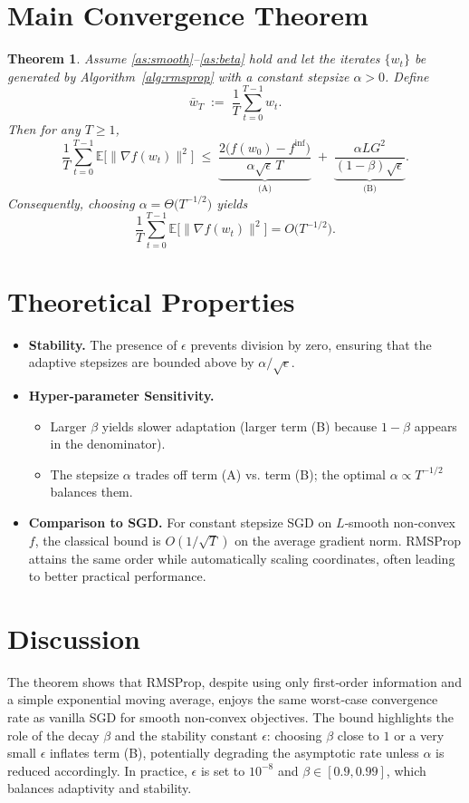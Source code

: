 \documentclass[11pt]{article}
\newtheorem{theorem}{Theorem}[section]
\begin{document}
\section*{Main Convergence Theorem}
\begin{theorem}\label{thm:main}
Assume \ref{as:smooth}–\ref{as:beta} hold and let the iterates $\{w_t\}$ be
generated by Algorithm~\ref{alg:rmsprop} with a constant stepsize $\alpha>0$.
Define
\[
\bar{w}_T \;:=\; \frac{1}{T}\sum_{t=0}^{T-1} w_t .
\]
Then for any $T\ge 1$,
\[
\frac{1}{T}\sum_{t=0}^{T-1}
\mathbb{E}\!\bigl[\|\nabla f(w_t)\|^2\bigr]
\;\le\;
\underbrace{\frac{2\bigl(f(w_0)-f^{\inf}\bigr)}{\alpha\sqrt{\epsilon}\,T}}_{\displaystyle
\text{(A)}}
\;+\;
\underbrace{\frac{\alpha L G^2}{(1-\beta)\sqrt{\epsilon}}}_{\displaystyle
\text{(B)}} .
\]
Consequently, choosing $\alpha = \Theta\!\bigl(T^{-1/2}\bigr)$ yields
\[
\frac{1}{T}\sum_{t=0}^{T-1}
\mathbb{E}\!\bigl[\|\nabla f(w_t)\|^2\bigr]
= O\!\bigl(T^{-1/2}\bigr).
\]
\end{theorem}

\section*{Theoretical Properties}
\begin{itemize}[leftmargin=*]
\item \textbf{Stability.} The presence of $\epsilon$ prevents division by zero,
ensuring that the adaptive stepsizes are bounded above by $\alpha/\sqrt{\epsilon}$.
\item \textbf{Hyper‑parameter Sensitivity.}
  \begin{itemize}
  \item Larger $\beta$ yields slower adaptation (larger term (B) because
    $1-\beta$ appears in the denominator).
  \item The stepsize $\alpha$ trades off term (A) vs. term (B); the optimal
    $\alpha\propto T^{-1/2}$ balances them.
  \end{itemize}
\item \textbf{Comparison to SGD.}
  For constant stepsize SGD on $L$‑smooth non‑convex $f$, the classical bound is
  $O(1/\sqrt{T})$ on the average gradient norm. RMSProp attains the same order
  while automatically scaling coordinates, often leading to better practical
  performance.
\end{itemize}

\section*{Discussion}
The theorem shows that RMSProp, despite using only first‑order information
and a simple exponential moving average, enjoys the same worst‑case
convergence rate as vanilla SGD for smooth non‑convex objectives.  The bound
highlights the role of the decay $\beta$ and the stability constant $\epsilon$:
choosing $\beta$ close to $1$ or a very small $\epsilon$ inflates term (B),
potentially degrading the asymptotic rate unless $\alpha$ is reduced
accordingly.  In practice, $\epsilon$ is set to $10^{-8}$ and $\beta\in[0.9,0.99]$,
which balances adaptivity and stability.
\end{document}
